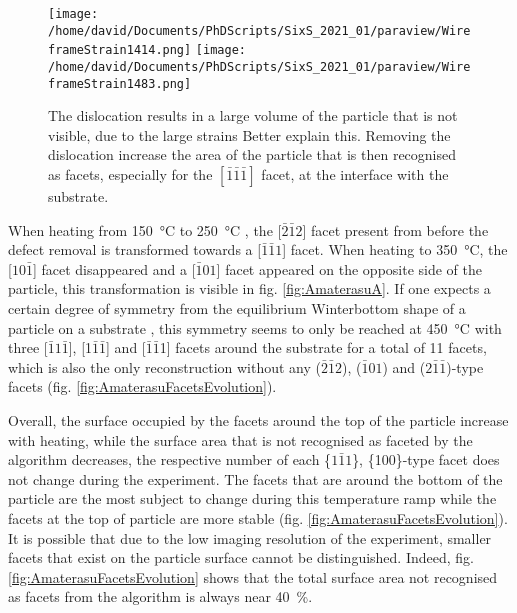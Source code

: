 \begin{figure}[!htb]
    \centering
    \texttt{[image: /home/david/Documents/PhDScripts/SixS\_2021\_01/paraview/WireframeStrain1414.png]}
    \texttt{[image: /home/david/Documents/PhDScripts/SixS\_2021\_01/paraview/WireframeStrain1483.png]}
    \caption{
        The dislocation results in a large volume of the particle that is not visible, due to the large strains \textcolor{Important}{Better explain this}.
        Removing the dislocation increase the area of the particle that is then recognised as facets, especially for the $[\bar{1}\bar{1}\bar{1}]$ facet, at the interface with the substrate.
    }
    \label{fig:AmaterasuDefect}
\end{figure}

When heating from \qty{150}{\degreeCelsius} to \qty{250}{\degreeCelsius} , the [$\bar{2}\bar{1}2$] facet present from before the defect removal is transformed towards a [$\bar{1}\bar{1}1$] facet.
When heating to \qty{350}{\degreeCelsius}, the [$10\bar{1}$] facet disappeared and a [$\bar{1}01$] facet appeared on the opposite side of the particle, this transformation is visible in fig. \ref{fig:AmaterasuA}.
If one expects a certain degree of symmetry from the equilibrium Winterbottom shape of a particle on a substrate \parencite{WINTERBOTTOM1967, Boukouvala2021}, this symmetry seems to only be reached at \qty{450}{\degreeCelsius} with three [$\bar{1}1\bar{1}$], [1$\bar{1}\bar{1}$] and [$\bar{1}\bar{1}$1] facets around the substrate for a total of 11 facets, which is also the only reconstruction without any ($\bar{2}\bar{1}2$), ($\bar{1}01$) and ($2\bar{1}\bar{1}$)-type facets (fig. \ref{fig:AmaterasuFacetsEvolution}).

Overall, the surface occupied by the facets around the top of the particle increase with heating, while the surface area that is not recognised as faceted by the algorithm decreases, the respective number of each \{$1\bar{1}1$\}, \{100\}-type facet does not change during the experiment.
The facets that are around the bottom of the particle are the most subject to change during this temperature ramp while the facets at the top of particle are more stable (fig. \ref{fig:AmaterasuFacetsEvolution}).
It is possible that due to the low imaging resolution of the experiment, smaller facets that exist on the particle surface cannot be distinguished.
Indeed, fig. \ref{fig:AmaterasuFacetsEvolution} shows that the total surface area not recognised as facets from the algorithm is always near \qty{40}{\percent}.

